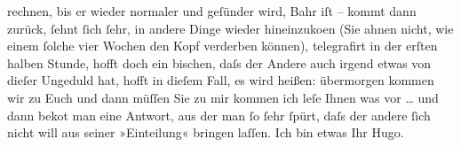 \begin{ledgroupsized}[t]{13cm}
                    rechnen, bis er wieder normaler und geſünder wird, Bahr iſt \label{K_L01539_1v}\label{K_L01539_1h} – kommt dann zurück, ſehnt ſich ſehr,
                    in andere Dinge wieder hineinzuko{\geminationm}en (Sie ahnen
                    nicht, wie einem ſolche vier Wochen den Kopf verderben können), telegrafirt {\pb}in der erſten halben Stunde,
                    hofft doch ein bischen, daſs der Andere auch irgend etwas von dieſer Ungeduld
                    hat, hofft in dieſem Fall, es wird heißen: übermorgen kommen wir zu Euch und
                    dann müſſen Sie zu mir kommen ich leſe Ihnen was vor {\dots} und dann beko{\geminationm}t man eine Antwort, aus der man ſo
                    ſehr ſpürt, daſs der andere ſich nicht will aus seiner »Einteilung« bringen
                    laſſen. Ich bin etwas \label{T_L01539_1v}\label{T_L01539_1h}\pend
           \pstart Ihr \spacefill\mbox{Hugo.}\pend{}          \endnumbering{}\end{ledgroupsized}  \newcommand{\dateiname}{L01539}\newcommand{\titel}{Hugo von Hofmannsthal an Arthur Schnitzler, [7. 8. 1905]}\newcommand{\editorInnen}{ Martin Anton Müller und Gerd-Hermann Susen}
            \footnotesize
\begin{ledgroupsized}[t]{11.5cm}
\end{ledgroupsized}
         
      